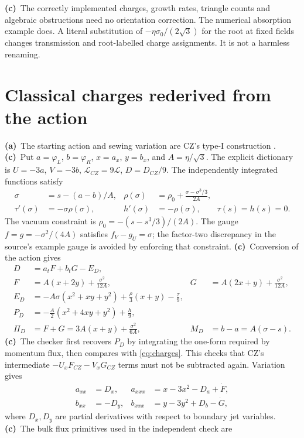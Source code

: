 \documentclass[11pt,a4paper]{article}
\newcommand{\La}{\textbf{(a)}\ }
\newcommand{\Lc}{\textbf{(c)}\ }
\begin{document}
\Lc The correctly implemented charges, growth rates, triangle counts and
algebraic obstructions need no orientation correction. The numerical
absorption example does. A literal substitution of
$-\eta\sigma_0/(2\sqrt3)$ for the root at fixed fields changes transmission
and root-labelled charge assignments. It is not a harmless renaming.

\section{Classical charges rederived from the action}
\La The starting action and sewing variation are CZ's type-I construction
\cite[Secs.~2--3]{CZ}. \Lc Put $a=\varphi_L$, $b=\varphi_R$, $x=a_x$,
$y=b_x$, and $A=\eta/\sqrt3$. The explicit dictionary is
$U=-3a$, $V=-3b$, $\mathcal L_{CZ}=9\mathcal L$, $D=D_{CZ}/9$.
The independently integrated functions satisfy
\begin{align}
 \sigma&=s-(a-b)/A,&
 \rho(\sigma)&=\rho_0+\frac{\sigma-\sigma^3/3}{2A},\\
 \tau'(\sigma)&=-\sigma\rho(\sigma),&
 h'(\sigma)&=-\rho(\sigma),\qquad \tau(s)=h(s)=0.
\end{align}
The vacuum constraint is $\rho_0=-(s-s^3/3)/(2A)$. The gauge
$f=g=-\sigma^2/(4A)$ satisfies $f_V-g_U=\sigma$; the factor-two discrepancy
in the source's example gauge is avoided by enforcing that constraint.
\Lc Conversion of the action gives
\begin{align}
 D&=a_tF+b_tG-E_D,\\
 F&=A(x+2y)+\frac{\sigma^2}{12A},&
 G&=A(2x+y)+\frac{\sigma^2}{12A},\\
 E_D&=-A\sigma(x^2+xy+y^2)+\frac{\rho}{3}(x+y)-\frac{\tau}{9},\\
 P_D&=-\frac A2(x^2+4xy+y^2)+\frac h9,\\
 \Pi_D&=F+G=3A(x+y)+\frac{\sigma^2}{6A},&
 M_D&=b-a=A(\sigma-s).
 \label{eq:charges}
\end{align}
\Lc The checker first recovers $P_D$ by integrating the one-form required
by momentum flux, then compares with \eqref{eq:charges}. This checks that
CZ's intermediate $-U_xF_{CZ}-V_xG_{CZ}$ terms must not be subtracted again.
Variation gives
\begin{align}
 a_{xx}&=D_x,&a_{xxx}&=x-3x^2-D_a+\dot F,\\
 b_{xx}&=-D_y,&b_{xxx}&=y-3y^2+D_b-\dot G,
\end{align}
where $D_x,D_y$ are partial derivatives with respect to boundary jet variables.
\Lc The bulk flux primitives used in the independent check are
\end{document}
